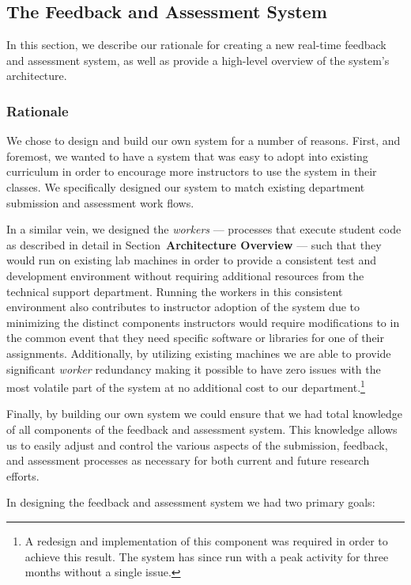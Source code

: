\subsection{The Feedback and Assessment System}

In this section, we describe our rationale for creating a new real-time
feedback and assessment system, as well as provide a high-level overview of the
system's architecture.

\subsubsection{Rationale}
We chose to design and build our own system for a number of reasons. First, and
foremost, we wanted to have a system that was easy to adopt into existing
curriculum in order to encourage more instructors to use the system in their
classes. We specifically designed our system to match existing department
submission and assessment work flows.

In a similar vein, we designed the \emph{workers} --- processes that execute
student code as described in detail in Section~\textbf{Architecture Overview}
--- such that they would run on existing lab machines in order to provide a
consistent test and development environment without requiring additional
resources from the technical support department. Running the workers in this
consistent environment also contributes to instructor adoption of the system
due to minimizing the distinct components instructors would require
modifications to in the common event that they need specific software or
libraries for one of their assignments. Additionally, by utilizing existing
machines we are able to provide significant \emph{worker} redundancy making it
possible to have zero issues with the most volatile part of the system at no
additional cost to our department.\footnote{A redesign and implementation of
  this component was required in order to achieve this result. The system has
  since run with a peak activity for three months without a single issue.}

Finally, by building our own system we could ensure that we had total knowledge
of all components of the feedback and assessment system. This knowledge allows
us to easily adjust and control the various aspects of the submission,
feedback, and assessment processes as necessary for both current and future
research efforts.

In designing the feedback and assessment system we had two primary goals:

